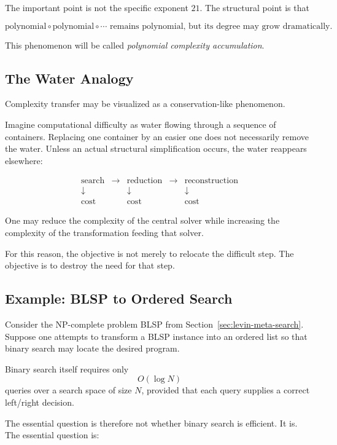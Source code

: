 \documentclass[11pt]{article}
\theoremstyle{plain}
\theoremstyle{definition}
\begin{document}
The important point is not the specific exponent \(21\).  The structural
point is that

\[
    \boxed{
    \text{polynomial} \circ \text{polynomial} \circ \cdots
    \text{ remains polynomial, but its degree may grow dramatically.}
    }
\]

This phenomenon will be called \emph{polynomial complexity accumulation}.

\subsection{The Water Analogy}

Complexity transfer may be visualized as a conservation-like phenomenon.

Imagine computational difficulty as water flowing through a sequence of
containers.  Replacing one container by an easier one does not necessarily
remove the water.  Unless an actual structural simplification occurs, the
water reappears elsewhere:

\[
\boxed{
\begin{array}{ccccc}
\text{search} &
\longrightarrow &
\text{reduction} &
\longrightarrow &
\text{reconstruction}
\\[3pt]
\downarrow && \downarrow && \downarrow\\
\text{cost} && \text{cost} && \text{cost}
\end{array}
}
\]

One may reduce the complexity of the central solver while increasing the
complexity of the transformation feeding that solver.

For this reason, the objective is not merely to relocate the difficult step.
The objective is to destroy the need for that step.

\subsection{Example: BLSP to Ordered Search}

Consider the NP-complete problem \textsc{BLSP} from
Section~\ref{sec:levin-meta-search}.  Suppose one attempts to transform a
\textsc{BLSP} instance into an ordered list so that binary search may locate
the desired program.

Binary search itself requires only
\[
    O(\log N)
\]
queries over a search space of size \(N\), provided that each query supplies
a correct left/right decision.

The essential question is therefore not whether binary search is efficient.
It is.  The essential question is:
\end{document}
